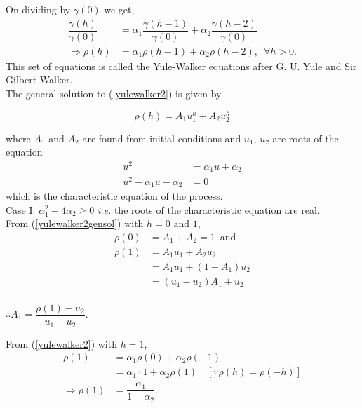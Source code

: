 \documentclass[11pt, a4paper]{article}
\numberwithin{equation}{section}
\theoremstyle{definition}
\begin{document}
On dividing by $\gamma(0)$ we get,
\begin{align}\label{yulewalker2}
\dfrac{\gamma(h)}{\gamma(0)} &= \alpha_1 \dfrac{\gamma(h-1)}{\gamma(0)} + \alpha_2 \dfrac{\gamma(h-2)}{\gamma(0)} \nonumber \\[0.5em]
\Rightarrow \rho(h) &= \alpha_1 \rho(h-1) + \alpha_2 \rho(h-2), \,\,\, \forall h > 0.
\end{align}
This set of equations is called the Yule-Walker equations after G. U. Yule and Sir Gilbert Walker. \\[0.25em]

The general solution to (\ref{yulewalker2}) is given by

\begin{equation}\label{yulewalker2gensol}
\rho(h) = A_1 u_{1}^{h} + A_2 u_{2}^{h}
\end{equation}

where $A_1$ and $A_2$ are found from initial conditions and $u_1$, $u_2$ are roots of the equation
\begin{align}\label{characteristicequation1}
u^2 &= \alpha_1 u + \alpha_2 \nonumber \\[0.5em]
u^2 - \alpha_1 u - \alpha_2 &= 0
\end{align}
which is the characteristic equation of the process.\\[1em]

\underline{Case I:} $\alpha_1^2 + 4\alpha_2 \geq 0$ \textit{i.e.} the roots of the characteristic equation are real.\\[1em]

From (\ref{yulewalker2gensol}) with $h = 0 \text{ and } 1$,
\begin{align*}
\rho(0) &= A_1 + A_2 = 1 \,\,\, \text{and} \\[0.5em]
\rho(1) &= A_1 u_1 + A_2 u_2 \\[0.5em]
&= A_1 u_1 + (1 - A_1) u_2 \\[0.5em]
&= (u_1 - u_2) A_1 + u_2 \\[0.5em]
\end{align*}

\begin{center}
$\therefore A_1 = \dfrac{\rho(1) - u_2}{u_1 - u_2}$.
\end{center}

From (\ref{yulewalker2}) with $h = 1$,
\begin{align*}
\rho(1) &= \alpha_1 \rho(0) + \alpha_2 \rho(-1) \\[0.5em]
&= \alpha_1 \cdot 1 + \alpha_2 \rho(1) \quad \left[\because \rho(h) = \rho(-h)\right] \\[0.5em]
\Rightarrow \rho(1) &= \dfrac{\alpha_1}{1 - \alpha_2}.
\end{align*}
\end{document}
